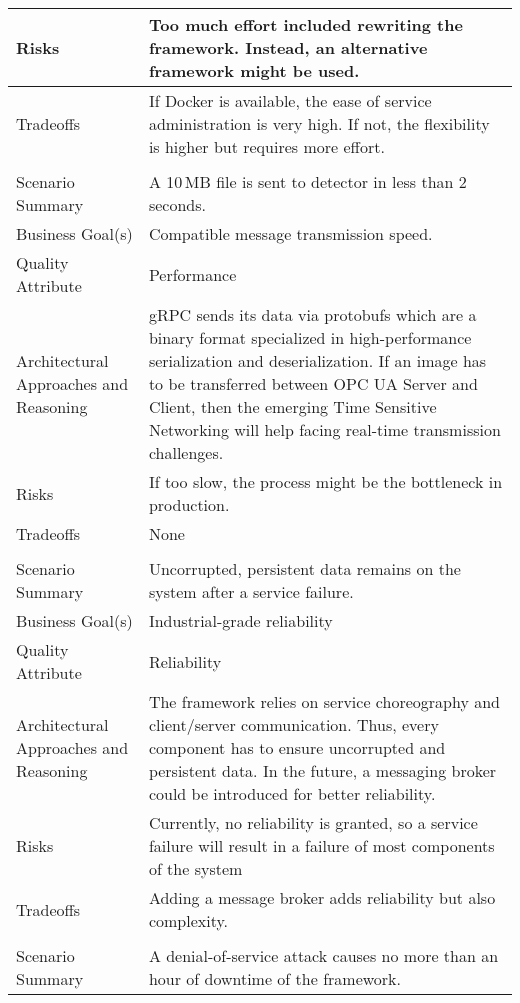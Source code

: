 {\begin{longtable}{| P{0.2\textwidth} | P{0.74\textwidth} |}
Risks &  Too much effort included rewriting the framework. Instead, an alternative framework might be used.\\ \hline
Tradeoffs & If Docker is available, the ease of service administration is very high. If not, the flexibility is higher but requires more effort.\\ \hline
{}
 \\ \hline
Scenario Summary & A 10\,MB file is sent to detector in less than 2 seconds. \\ \hline
Business Goal(s) & Compatible message transmission speed.\\ \hline
Quality Attribute & Performance\\ \hline
Architectural Approaches and Reasoning &  gRPC sends its data via protobufs which are a binary format specialized in high-performance serialization and deserialization. If an image has to be transferred between OPC UA Server and Client, then the emerging Time Sensitive Networking will help facing real-time transmission challenges.\\ \hline
Risks & If too slow, the process might be the bottleneck in production.\\ \hline
Tradeoffs &  None\\ \hline
{}
 \\ \hline
Scenario Summary & Uncorrupted, persistent data remains on the system after a service failure.\\ \hline
Business Goal(s) & Industrial-grade reliability \\ \hline
Quality Attribute & Reliability\\ \hline
Architectural Approaches and Reasoning & The framework relies on service choreography and client/server communication. Thus, every component has to ensure uncorrupted and persistent data. In the future, a messaging broker could be introduced for better reliability.\\ \hline
Risks & Currently, no reliability is granted, so a service failure will result in a failure of most components of the system \\ \hline
Tradeoffs & Adding a message broker adds reliability but also complexity. \\ \hline
{}
 \\ \hline
Scenario Summary & A denial-of-service attack causes no more than an hour of downtime of the framework.\\ \hline

\end{longtable}}
